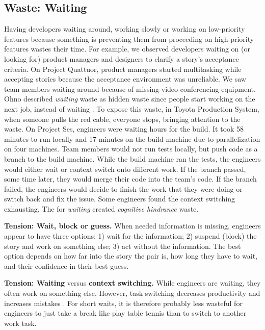 \subsection{Waste: Waiting}
Having developers waiting around, working slowly or working on low-priority features because something is preventing them from proceeding on high-priority features wastes their time. For example, we observed developers waiting on (or looking for) product managers and designers to clarify a story's acceptance criteria. On Project Quattuor, product managers started multitasking while accepting stories because the acceptance environment was unreliable. We saw team members waiting around because of missing video-conferencing equipment. 
Ohno described \textit{waiting} waste as hidden waste since people start working on the next job, instead of waiting \cite{OhnoToyotaProductionSystem}. To expose this waste, in Toyota Production System, when someone pulls the red cable, everyone stops, bringing attention to the waste. On Project Ses, engineers were waiting hours for the build. It took 58 minutes to run locally and 17 minutes on the build machine due to parallelization on four machines. Team members would not run tests locally, but push code as a branch to the build machine. While the build machine ran the tests, the engineers would either wait or context switch onto different work. If the branch passed, some time later, they would merge their code into the team's code. If the branch failed, the engineers would decide to finish the work that they were doing or switch back and fix the issue. Some engineers found the context switching exhausting. The  for \textit{waiting} created \textit{cognitive hindrance} waste.

\textbf{Tension: Wait, block or guess.}
When needed information is missing, engineers appear to have three options: 1) wait for the information; 2) suspend (block) the story and work on something else; 3) act without the information. The best option depends on how far into the story the pair is, how long they have to wait, and their confidence in their best guess.

\textbf{Tension: Waiting} versus \textbf{context switching.}
While engineers are waiting, they often work on something else. However, task switching decreases productivity and increases mistakes \cite{MonsellTaskSwitching}. For short waits, it is therefore probably less wasteful for engineers to just take a break like play table tennis than to switch to another work task. 

